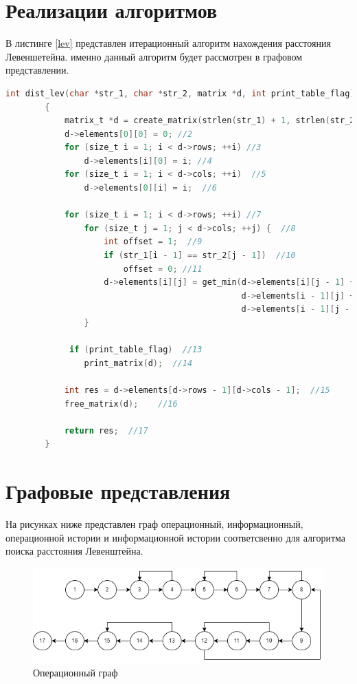 \documentclass[12pt]{report}
\begin{document}
    \section{Реализации алгоритмов}

    В листинге \ref{lev} представлен итерационный алгоритм нахождения расстояния Левеншетейна. именно данный алгоритм будет рассмотрен в графовом представлении.

	\begin{lstlisting}[label=lev,caption=Листинг итерационного алгоритма нахождения расстояния Левенштейна,language=C]
		int dist_lev(char *str_1, char *str_2, matrix *d, int print_table_flag)
        {
            matrix_t *d = create_matrix(strlen(str_1) + 1, strlen(str_2) + 1);//1
            d->elements[0][0] = 0; //2
            for (size_t i = 1; i < d->rows; ++i) //3
                d->elements[i][0] = i; //4
            for (size_t i = 1; i < d->cols; ++i)  //5
                d->elements[0][i] = i;  //6
            
            for (size_t i = 1; i < d->rows; ++i) //7
                for (size_t j = 1; j < d->cols; ++j) {  //8
                    int offset = 1;  //9
                    if (str_1[i - 1] == str_2[j - 1])  //10
                        offset = 0; //11
                    d->elements[i][j] = get_min(d->elements[i][j - 1] + 1,
                                                d->elements[i - 1][j] + 1,          
                                                d->elements[i - 1][j - 1] + offset); //12 
                }

             if (print_table_flag)  //13
                print_matrix(d);  //14
        
            int res = d->elements[d->rows - 1][d->cols - 1];  //15
            free_matrix(d);    //16
        
            return res;  //17
        }
	\end{lstlisting}

    \section{Графовые представления}

    На рисунках ниже представлен граф операционный, информационный, операционной истории и информационной истории соответсвенно для алгоритма поиска расстояния Левенштейна.

    \begin{figure}[H]
		\centering
		\includegraphics[width=0.9\linewidth]{hw_dia-first.png}
		\caption{Операционный граф}
		\label{fig:ris1}
	\end{figure}
\end{document}
